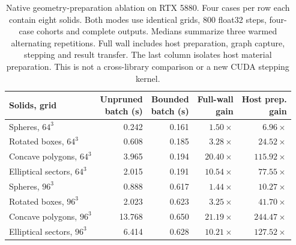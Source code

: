 \begin{table}[tbp]
\centering
\small
\renewcommand{\arraystretch}{1.15}
\caption{Native geometry-preparation ablation on RTX 5880. Four cases per row each contain eight solids. Both modes use identical grids, 800 float32 steps, four-case cohorts and complete outputs. Medians summarize three warmed alternating repetitions. Full wall includes host preparation, graph capture, stepping and result transfer. The last column isolates host material preparation. This is not a cross-library comparison or a new CUDA stepping kernel.}
\label{tab:geometry-ensembles}
\begin{tabular}{@{}lrrrr@{}}
\toprule
Solids, grid & \shortstack{Unpruned\\batch (s)} & \shortstack{Bounded\\batch (s)} & \shortstack{Full-wall\\gain} & \shortstack{Host prep.\\gain} \\
\midrule
Spheres, $64^3$ & 0.242 & 0.161 & $1.50\times$ & $6.96\times$ \\
Rotated boxes, $64^3$ & 0.608 & 0.185 & $3.28\times$ & $24.52\times$ \\
Concave polygons, $64^3$ & 3.965 & 0.194 & $20.40\times$ & $115.92\times$ \\
Elliptical sectors, $64^3$ & 2.015 & 0.191 & $10.54\times$ & $77.55\times$ \\
Spheres, $96^3$ & 0.888 & 0.617 & $1.44\times$ & $10.27\times$ \\
Rotated boxes, $96^3$ & 2.023 & 0.623 & $3.25\times$ & $41.70\times$ \\
Concave polygons, $96^3$ & 13.768 & 0.650 & $21.19\times$ & $244.47\times$ \\
Elliptical sectors, $96^3$ & 6.414 & 0.628 & $10.21\times$ & $127.52\times$ \\
\bottomrule
\end{tabular}
\end{table}
